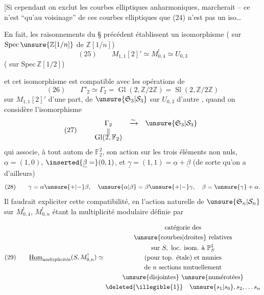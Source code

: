 [Si cependant on exclut les courbes elliptiques anharmoniques,  marcherait -- ce n'est ``qu'au voisinage'' de ces courbes elliptiques que (24) n'est pas un iso\ldots


En fait, les raisonnements du \S{} précédent établissent un isomorphisme ( sur  $\mathrm{Spec}\,\unsure{\mathbb Z[1/n]}$ de $\mathbb Z[1/n]$)
\[
(25)\qquad M_{1,1}[2]'\simeq M_{0,4}^{!}\simeq U_{0,3}
\]
( sur $\mathrm{Spec}\,\mathbb Z[1/2]$)


et cet isomorphisme est compatible avec les opérations de 
\[
(26)\qquad \Gamma'_2\simeq\Gamma_2=\operatorname{Gl}(2,\mathbb Z/2\mathbb Z)=\operatorname{Sl}(2,\mathbb Z/2\mathbb Z)
\]
sur $M_{1,1}[2]'$ d'une part, de $\unsure{\mathfrak S_3|\mathcal S_3}$ sur $U_{0,3}$ d'autre , quand on considère l'isomorphisme
\[
(27)\qquad
\begin{array}{ccc}
\Gamma_2 & \xrightarrow{\sim} & \unsure{\mathfrak S_3|\mathcal S_3}\\
\Vert &&\\[-4pt]
\operatorname{Gl}(2,\mathbb F_2)&&
\end{array}
\]
qui associe, à tout autom de $\mathbb F_2^2$, son action sur les trois éléments non nuls, $\underline{\alpha}=(1,0)$, $\inserted{\underline{\beta}=}(0,1)$, et $\underline{\gamma}=(1,1)=\underline{\alpha}+\underline{\beta}$ (de sorte qu'on a d'ailleurs) 
\[
(28)\qquad \gamma=\alpha\unsure{+|-}\beta,\quad \unsure{\alpha|\beta}=\beta\unsure{+|-}\gamma,\quad \beta=\unsure{\gamma}+\alpha.
\]
Il faudrait expliciter cette compatibilité, en  l'action naturelle de $\unsure{\mathfrak S_n|\mathcal S_n}$ sur $M_{0,4}^{!}$, $M_{0,n}^{!}$ étant la multiplicité modulaire définie par


\[
(29)\qquad
\underline{\operatorname{Hom}}_{\text{multiplicités}}(S,M_{0,n}^{!})\simeq
\begin{gathered}
\text{catégorie des}\\
\text{\unsure{courbes|droites} relatives}\\
\text{sur }S,\ \text{loc. isom. à }\mathbb P^1_S\\
\text{(pour top. étale) et munies}\\
\text{de }n\text{ sections mutuellement}\\
\text{\unsure{disjointes} \unsure{numérotées}}\\
\deleted{\illegible{1}}\quad\unsure{s_1|s_0},s_2,\ldots s_n
\end{gathered}
\]

